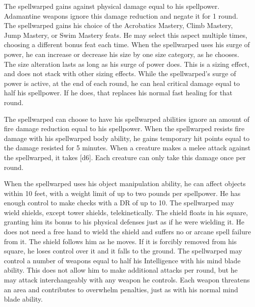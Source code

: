         The spellwarped gains  against physical damage equal to his spellpower.
        Adamantine weapons ignore this damage reduction and negate it for 1 round.
        The spellwarped gains his choice of the Acrobatics Mastery, Climb Mastery, Jump Mastery, or Swim Mastery feats.
        He may select this aspect multiple times, choosing a different bonus feat each time.
        When the spellwarped uses his surge of power, he can increase or decrease his size by one size category, as he chooses.
        The size alteration lasts as long as his surge of power does.
        This is a sizing effect, and does not stack with other sizing effects.
        While the spellwarped's surge of power is active, at the end of each round, he can heal critical damage equal to half his spellpower.
        If he does, that replaces his normal fast healing for that round.

        The spellwarped can choose to have his spellwarped abilities ignore an amount of fire damage reduction equal to his spellpower.
        When the spellwarped resists fire damage with his spellwarped body ability, he gains temporary hit points equal to the damage resisted for 5 minutes.
        When a creature makes a melee attack against the spellwarped, it takes [d6].
        Each creature can only take this damage once per round.

        When the spellwarped uses his object manipulation ability, he can affect objects within 10 feet, with a weight limit of up to two pounds per spellpower.
        He has enough control to make checks with a DR of up to 10.
        The spellwarped may wield shields, except tower shields, telekinetically.
        The shield floats in his square, granting him its bonus to his physical defenses just as if he were wielding it.
        He does not need a free hand to wield the shield and suffers no  or arcane spell failure from it.
        The shield follows him as he moves.
        If it is forcibly removed from his square, he loses control over it and it falls to the ground.
        The spellwarped may control a number of weapons equal to half his Intelligence with his mind blade ability.
        This does not allow him to make additional attacks per round, but he may attack interchangeably with any weapon he controls.
        Each weapon threatens an area and contributes to overwhelm penalties, just as with his normal mind blade ability.


